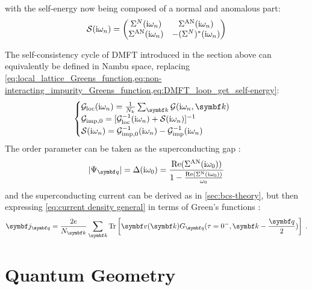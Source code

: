 \documentclass[../main.tex]{subfiles}
\begin{document}
with the self-energy now being composed of a normal and anomalous part:
\begin{align}
	\mathcal{S} (\mathrm{i} \omega_n) = 
	\begin{pmatrix}
		\Sigma^{N} (\mathrm{i} \omega_n) & \Sigma^{\mathrm{AN}} (\mathrm{i} \omega_n) \\
		\Sigma^{\mathrm{AN}} (\mathrm{i} \omega_n) & -(\Sigma^{N})^* (\mathrm{i} \omega_n)
	\end{pmatrix}
\end{align}

The self-consistency cycle of DMFT introduced in the section above can equivalently be defined in Nambu space, replacing \cref{eq:local_lattice_Greens_function,eq:non-interacting_impurity_Greens_function,eq:DMFT_loop_get_self-energy}:
\begin{align}
	\begin{cases}
		\mathcal{G}_{\mathrm{loc}} (\iu \omega_n) = \frac{1}{N_k} \sum_{\vb{k}} \mathcal{G} (\iu \omega_n, \vb{k}) \\
		\mathcal{G}_{\mathrm{imp}, 0} = [\mathcal{G}_{\mathrm{loc}}^{-1} (\iu \omega_n) + \mathcal{S} (\iu \omega_n)]^{-1} \\
		\mathcal{S} (\iu \omega_n) = \mathcal{G}_{\mathrm{imp}, 0}^{-1} (\iu \omega_n) - \mathcal{G}_{\mathrm{imp}}^{-1} (\iu \omega_n)
	\end{cases}
\end{align}
The order parameter can be taken as the superconducting gap \cite{wittBypassingLatticeBCS2024}:
\begin{equation}
	\vert \Psi_{\vb{q}} \vert =  \Delta (\iu \omega_0) = \frac{\RE(\Sigma^{\mathrm{AN}} (\iu \omega_0))}{1 - \frac{\RE(\Sigma^{\mathrm{N}} (\iu \omega_0))}{\omega_0}}
\end{equation}
and the superconducting current can be derived as in \cref{sec:bcs-theory}, but then expressing \cref{eq:current density general} in terms of Green's functions \cite{wittBypassingLatticeBCS2024}:
\begin{equation}
	\vb{j}_{\vb{q}} = \frac{2 e}{N_{\vb{k}}} \sum_{\vb{k}} \Tr \left[ \vb{v} (\vb{k}) G_{\vb{q}} (\tau = 0^-, \vb{k} - \frac{\vb{q}}{2}) \right] \;.
\end{equation}


\section{Quantum Geometry}\label{sec:quantum-metric}
\end{document}
